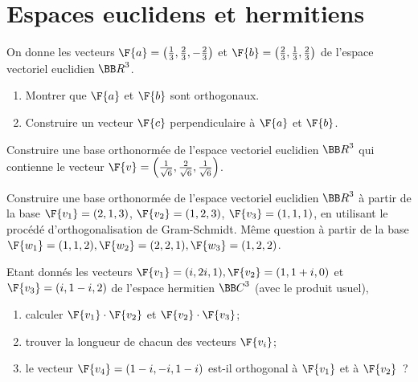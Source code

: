 \documentclass[12pt,french,oneside,a4paper]{memoir} %
\begin{document}
\chapter{Espaces euclidens et hermitiens}

\begin{exo}
On donne les vecteurs $\F{\mathstrut{a}}=\left(\frac{1}{3}, \frac{2}{3}, - \frac{2}{3}\right)$ et $\F{\mathstrut{b}}=\left(\frac{2}{3}, \frac{1}{3}, \frac{2}{3}\right)$ de l'espace vectoriel euclidien ${\BB R}^3$. 
\begin{enumerate}
\item  Montrer que $\F{\mathstrut{a}}$ et $\F{\mathstrut{b}}$ sont orthogonaux.
\item  Construire un vecteur $\F{\mathstrut{c}}$ perpendiculaire à $\F{\mathstrut{a}}$ et $\F{\mathstrut{b}}$. 
\end{enumerate}
\end{exo}
\begin{exo}
Construire une base orthonormée de l'espace vectoriel euclidien ${\BB R}^3$ qui contienne le vecteur $\F{\mathstrut{v}}=\left(\frac{1}{\sqrt{6}}, \frac{2}{\sqrt{6}}, \frac{1}{\sqrt{6}}\right)$.
\end{exo}
\begin{exo}
Construire une base orthonormée de l'espace vectoriel euclidien ${\BB R}^3$ à partir de la base $\F{\mathstrut{v_1}}=(2,1,3)$, $\F{\mathstrut{v_2}}=(1,2,3)$, $\F{\mathstrut{v_3}}=(1,1,1)$, en utilisant le procédé d'orthogonalisation de Gram-Schmidt. Même question à partir de la base 
$\F{\mathstrut{w_1}}=(1,1,2), \F{\mathstrut{w_2}}=(2,2,1), \F{\mathstrut{w_3}}=(1,2,2)$.
\end{exo}
\begin{exo}
Etant donnés les vecteurs $\F{\mathstrut{v_1}}=(i,2i, 1), \F{\mathstrut{v_2}}=(1,1+i,0)$ et $\F{\mathstrut{v_3}}=(i,1-i,2)$ de l'espace hermitien ${\BB C}^3$ (avec le produit usuel), 

\begin{enumerate}
\item  calculer $\F{\mathstrut{v_1}} \cdot \F{\mathstrut{v_2}}$ et $\F{\mathstrut{v_2}} \cdot  \F{\mathstrut{v_3}}$; 
\item  trouver la longueur de chacun des vecteurs $\F{\mathstrut{v_i}}$; 
\item  le vecteur $\F{\mathstrut{v_4}}=(1-i,-i,1-i)$ est-il orthogonal à $\F{\mathstrut{v_1}}$ et à $\F{\mathstrut{v_2}}$~?
\end{enumerate}
\end{exo}
\end{document}
